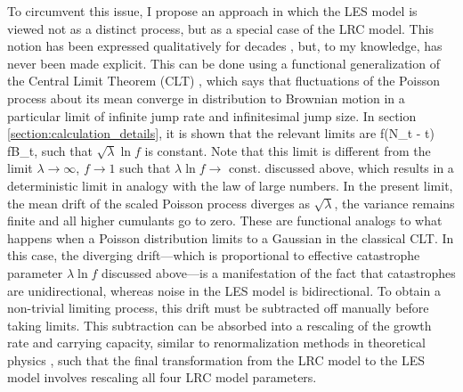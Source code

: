 To circumvent this issue, I propose an approach in which the LES model is viewed not as a distinct process, but as a special case of the LRC model.  This notion has been expressed qualitatively for decades \cite{shaffer1987minimum,lande1993risks}, but, to my knowledge, has never been made explicit.  This can be done using a functional generalization of the Central Limit Theorem (CLT) \cite{jacod2013limit}, which says that fluctuations of the Poisson process about its mean converge in distribution to Brownian motion in a particular limit of infinite jump rate and infinitesimal jump size.  In section \ref{section:calculation_details}, it is shown that the relevant limits are 
\be
\ln f(N_t - \lambda t)  \sqrt{\lambda} \ln fB_t,
\ee
\noindent such that $\sqrt{\lambda}\ln f$ is constant.  Note that this limit is different from the limit $\lambda\to\infty$, $f\to 1$ such that $\lambda\ln f \to $ const. discussed above, which results in a deterministic limit in analogy with the law of large numbers. In the present limit, the mean drift of the scaled Poisson process diverges as $\sqrt{\lambda}$, the variance remains finite and all higher cumulants go to zero.  These are functional analogs to what happens when a Poisson distribution limits to a Gaussian in the classical CLT.   In this case, the diverging drift---which is proportional to effective catastrophe parameter $\lambda\ln f$ discussed above---is a manifestation of the fact that catastrophes are unidirectional, whereas noise in the LES model is bidirectional.  To obtain a non-trivial limiting process, this drift must be subtracted off manually before taking limits.  This subtraction can be absorbed into a rescaling of the growth rate and carrying capacity, similar to renormalization methods in theoretical physics \cite{peskin1995quantum}, such that the final transformation from the LRC model to the LES model involves rescaling all four LRC model parameters.

